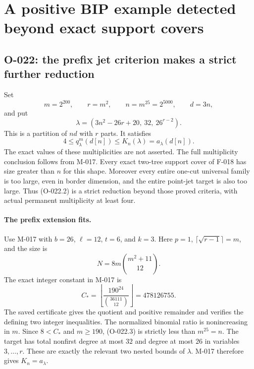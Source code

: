 \section{A positive BIP example detected beyond exact support covers}

\subsection{O-022: the prefix jet criterion makes a strict further reduction}
Set
\[
 m=2^{200},\qquad r=m^2,\qquad n=m^{25}=2^{5000},
 \qquad d=3n,
\]
and put
\[
           \lambda=(3n^2-26r+20,\ 32,\ 26^{r-2}).
                                                               \tag{O-022.1}
\]
This is a partition of $nd$ with $r$ parts. It satisfies
\[
                  4\leq q^m_\lambda(d[n])
                                \leq K_n(\lambda)=a_\lambda(d[n]).
                                                               \tag{O-022.2}
\]
The exact values of these multiplicities are not asserted.
The full multiplicity conclusion follows from M-017.
Every exact two-tree support cover of F-018 has size greater
than $n$ for this shape. Moreover every entire one-cut
universal family is too large, even in border dimension,
and the entire point-jet target is also too large.
Thus (O-022.2) is a strict reduction beyond those proved
criteria, with actual permanent multiplicity at least four.

\paragraph{The prefix extension fits.}
Use M-017 with $b=26$, $\ell=12$, $t=6$, and $k=3$.
Here $p=1$, $\lceil\sqrt{r-1}\rceil=m$, and the size is
\[
                       N=8m\binom{m^2+11}{12}.
                                                               \tag{O-022.3}
\]
The exact integer constant in M-017 is
\[
 C_*=\left\lfloor\frac{190^{24}}{\binom{36111}{12}}\right\rfloor
                  =478126755.
                                                               \tag{O-022.4}
\]
The saved certificate gives the quotient and positive
remainder and verifies the defining two integer inequalities.
The normalized binomial ratio is nonincreasing in $m$.
Since $8<C_*$ and $m\geq190$, (O-022.3) is strictly
less than $m^{25}=n$. The target has total nonfirst
degree at most $32$ and degree at most $26$ in variables
$3,\ldots,r$. These are exactly the relevant two nested
bounds of $\lambda$. M-017 therefore gives $K_n=a_\lambda$.

